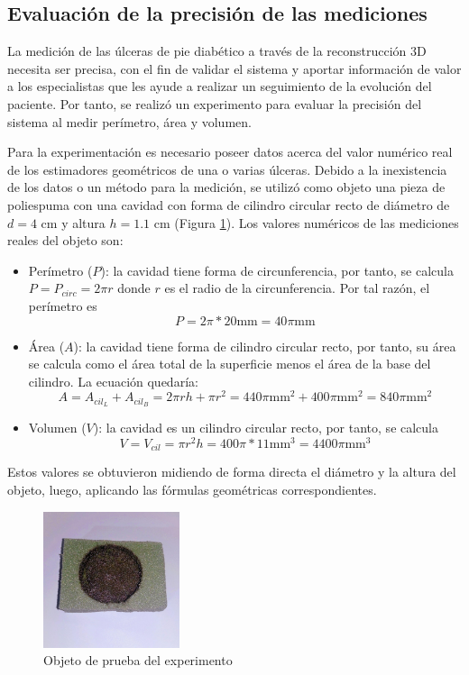\subsection{Evaluación de la precisión de las mediciones}\label{sec:expPrec}

La medición de las úlceras de pie diabético a través de la reconstrucción 3D necesita ser precisa, con el fin de validar el sistema y aportar información de valor a los especialistas que les ayude a realizar un seguimiento de la evolución del paciente. Por tanto, se realizó un experimento para evaluar la precisión del sistema al medir perímetro, área y volumen. 

Para la experimentación es necesario poseer datos acerca del valor numérico real de los estimadores geométricos de una o varias úlceras. Debido a la inexistencia de los datos o un método para la medición, se utilizó como objeto una pieza de poliespuma con una cavidad con forma de cilindro circular recto de diámetro de $d = 4$ cm y altura $h = 1.1$ cm (Figura \ref{fig:recObj}). Los valores numéricos de las mediciones reales del objeto son:

\begin{itemize}
	\item Perímetro ($P$): la cavidad tiene forma de circunferencia, por tanto, se calcula $P = P_{circ} = 2\pi r$ donde $r$ es el radio de la circunferencia. Por tal razón, el perímetro es $$P = 2\pi * 20\text{mm} = 40\pi\text{mm}$$
	\item Área ($A$): la cavidad tiene forma de cilindro circular recto, por tanto, su área se calcula como el área total de la superficie menos el área de la base del cilindro. La ecuación quedaría:
	$$A = A_{cil_{L}} + A_{cil_{B}} =  2\pi rh + \pi r^2 = 440 \pi \text{mm}^2 + 400\pi \text{mm}^2 = 840 \pi\text{mm}^2$$ 
	\item Volumen ($V$): la cavidad es un cilindro circular recto, por tanto, se calcula $$V = V_{cil} = \pi r^2 h = 400\pi 
	* 11 \text{mm}^3 = 4400\pi \text{mm}^3$$
\end{itemize}

Estos valores se obtuvieron midiendo de forma directa el diámetro y la altura del objeto, luego, aplicando las fórmulas geométricas correspondientes. 

\begin{figure}[ht]
	\centering
	\includegraphics[width=4cm]{./Graphics/reconstruction-object.jpg}
	\caption{Objeto de prueba del experimento}
	\label{fig:recObj}
\end{figure}

